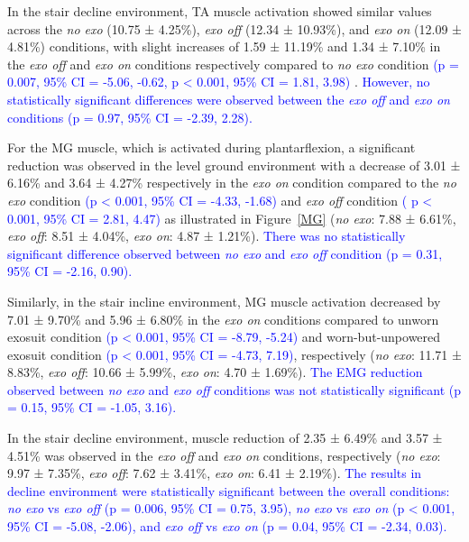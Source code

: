 \documentclass[journal,article,submit,pdftex,moreauthors]{Definitions/mdpi}
\begin{document}
In the stair decline environment, TA muscle activation showed similar values across the \textit{no exo} (10.75 ± 4.25\%), \textit{exo off} (12.34 ± 10.93\%), and \textit{exo on} (12.09 ± 4.81\%) conditions, with slight increases of 1.59 ± 11.19\% and 1.34 ± 7.10\% in the \textit{exo off} and \textit{exo on} conditions respectively compared to \textit{no exo} condition \textcolor{blue}{(p = 0.007, 95\% CI = -5.06, -0.62, p < 0.001, 95\% CI = 1.81, 3.98)}
. \textcolor{blue}{However, no statistically significant differences were observed between the \textit{exo off} and \textit{exo on} conditions (p = 0.97, 95\% CI = -2.39, 2.28).}
 


For the MG muscle, which is activated during plantarflexion, a significant reduction was observed in the level ground environment with a decrease of 3.01 ± 6.16\% and 3.64 ± 4.27\% respectively in the \textit{exo on} condition compared to the \textit{no exo} condition \textcolor{blue}{(p < 0.001, 95\% CI = -4.33, -1.68)} and \textit{exo off} condition \textcolor{blue}{( p < 0.001, 95\% CI = 2.81, 4.47)} as illustrated in Figure~\ref{MG} (\textit{no exo}: 7.88 ± 6.61\%, \textit{exo off}: 8.51 ± 4.04\%, \textit{exo on}: 4.87 ± 1.21\%). \textcolor{blue}{There was no statistically significant difference observed between \textit{no exo} and \textit{exo off} condition (p = 0.31, 95\% CI = -2.16, 0.90).}

Similarly, in the stair incline environment, MG muscle activation decreased by 7.01 ± 9.70\% and 5.96 ± 6.80\% in the \textit{exo on} conditions compared to unworn exosuit condition \textcolor{blue}{(p < 0.001, 95\% CI = -8.79, -5.24)} and worn-but-unpowered exosuit condition \textcolor{blue}{(p < 0.001, 95\% CI = -4.73, 7.19)}, respectively (\textit{no exo}: 11.71 ± 8.83\%, \textit{exo off}: 10.66 ± 5.99\%, \textit{exo on}: 4.70 ± 1.69\%). \textcolor{blue}{The EMG reduction observed between \textit{no exo} and \textit{exo off} conditions was not statistically significant (p = 0.15, 95\% CI = -1.05, 3.16).}

In the stair decline environment, muscle reduction of 2.35 ± 6.49\% and 3.57 ± 4.51\% was observed in the \textit{exo off} and \textit{exo on} conditions, respectively (\textit{no exo}: 9.97 ± 7.35\%, \textit{exo off}: 7.62 ± 3.41\%, \textit{exo on}: 6.41 ± 2.19\%). \textcolor{blue}{The results in decline environment were statistically significant between the overall conditions: \textit{no exo} vs \textit{exo off} (p = 0.006, 95\% CI = 0.75, 3.95), \textit{no exo} vs \textit{exo on} (p < 0.001, 95\% CI = -5.08, -2.06), and \textit{exo off} vs \textit{exo on} (p = 0.04, 95\% CI = -2.34, 0.03).}
\end{document}
